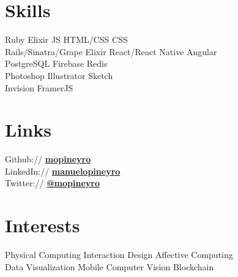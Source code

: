 \documentclass[]{deedy-resume-openfont}
\begin{document}
\begin{minipage}[t]{0.33\textwidth}

\section{Skills}
Ruby \textbullet{} Elixir \textbullet{} JS \textbullet{} HTML/CSS \textbullet{} CSS \\
Rails/Sinatra/Grape \textbullet{} Elixir \textbullet{} React/React Native \textbullet{} Angular \\
PostgreSQL \textbullet{} Firebase \textbullet{} Redis \\
Photoshop \textbullet{} Illustrator \textbullet{} Sketch \\
Invision \textbullet{} FramerJS \\
\sectionsep


\section{Links} 
Github:// \href{https://github.com/mopineyro}{\bf mopineyro } \\
LinkedIn://  \href{https://www.linkedin.com/in/manuelopineyro}{\bf manuelopineyro } \\
Twitter://  \href{https://twitter.com/mopineyro}{\bf @mopineyro }
\sectionsep

\section{Interests}
\textbullet{} Physical Computing \textbullet{} Interaction Design \textbullet{} Affective Computing \\ \textbullet{} Data Visualization  \textbullet{} Mobile \textbullet{} Computer Vision \textbullet{} Blockchain

%
%

\end{minipage} 
\hfill
\end{document}
